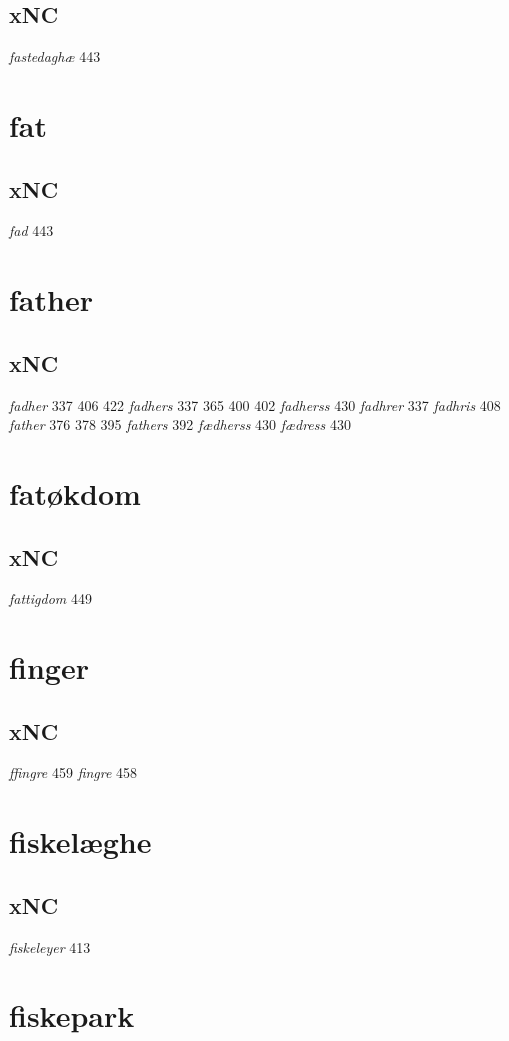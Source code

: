\documentclass[a4paper,twocolumn]{article}
\begin{document}
\subsection{xNC}
\label{sec:orga673b78}
\emph{fastedaghæ} 443 
\section{fat}
\label{sec:orgdda9c29}
\subsection{xNC}
\label{sec:org00e96f8}
\emph{fad} 443 
\section{father}
\label{sec:org1a7f04b}
\subsection{xNC}
\label{sec:org7a3dc6e}
\emph{fadher} 337 406 422 \emph{fadhers} 337 365 400 402 \emph{fadherss} 430 \emph{fadhrer} 337 \emph{fadhris} 408 \emph{father} 376 378 395 \emph{fathers} 392 \emph{fædherss} 430 \emph{fædress} 430 
\section{fatøkdom}
\label{sec:orgfabd08b}
\subsection{xNC}
\label{sec:orgce710fa}
\emph{fattigdom} 449 
\section{finger}
\label{sec:org95d82df}
\subsection{xNC}
\label{sec:org46ccf05}
\emph{ffingre} 459 \emph{fingre} 458 
\section{fiskelæghe}
\label{sec:orgfa6f16f}
\subsection{xNC}
\label{sec:orgbab1579}
\emph{fiskeleyer} 413 
\section{fiskepark}
\label{sec:orgca4ab37}
\end{document}

